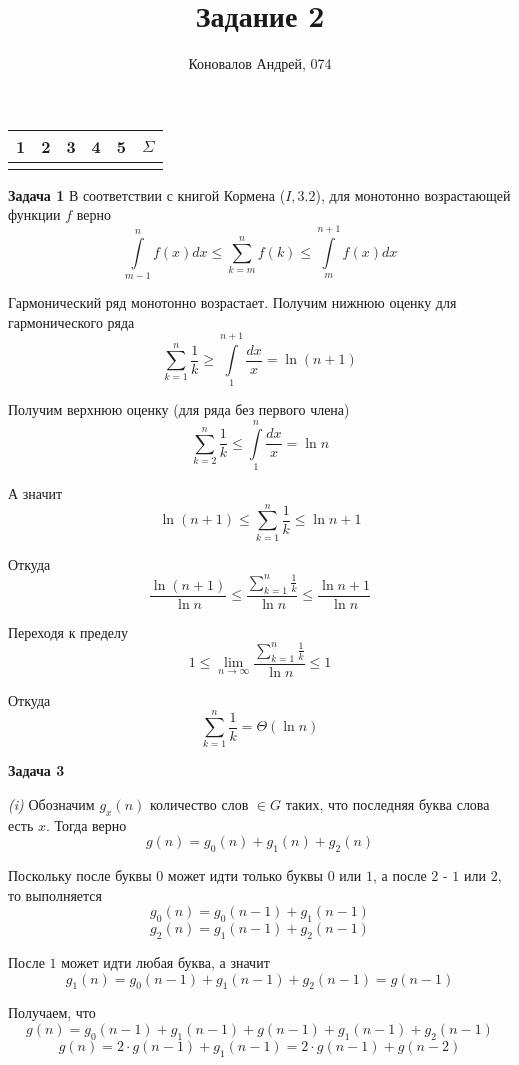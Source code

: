 \documentclass[10pt]{article}
\title{Задание 2}
\author{Коновалов Андрей, 074}
\date{}
\begin{document}
\maketitle

\noindent
\begin{tabularx}{\textwidth}{|C|C|C|C|C|C|}
   & 2 & 3 & 4 & 5 & $\Sigma$ \\
  \hline
  &&&&& \\
  \hline
\end{tabularx}

\bigskip

{\bf Задача 1}
В соответствии с книгой Кормена ($I, 3.2$), для монотонно возрастающей функции $f$ верно
$$
  \int\limits_{m - 1}^n f(x) dx \leq \sum\limits_{k = m}^n f(k) \leq \int\limits_m^{n + 1} f(x) dx
$$

Гармонический ряд монотонно возрастает. Получим нижнюю оценку для гармонического ряда
$$
  \sum\limits_{k = 1}^n \frac{1}{k} \geq \int\limits_1^{n + 1} \frac{dx}{x} = \ln{(n + 1)}
$$

Получим верхнюю оценку (для ряда без первого члена)
$$
  \sum\limits_{k = 2}^n \frac{1}{k} \leq \int\limits_1^n \frac{dx}{x} = \ln{n}
$$

А значит
$$
  \ln{(n + 1)} \leq \sum\limits_{k = 1}^n \frac{1}{k} \leq \ln{n} + 1
$$

Откуда
$$
  \frac{\ln{(n + 1)}}{\ln n} \leq \frac{\sum\limits_{k = 1}^n \frac{1}{k}}{\ln n} \leq \frac{\ln{n} + 1}{\ln n}
$$

Переходя к пределу
$$
  1 \leq \lim\limits_{n \to \infty}{\frac{\sum\limits_{k = 1}^n \frac{1}{k}}{\ln n}} \leq 1
$$

Откуда
$$
  \sum\limits_{k = 1}^n \frac{1}{k} = \Theta(\ln{n})
$$

\medskip

{\bf Задача 3}

{\it (i)}
Обозначим $g_x(n)$ количество слов $\in G$ таких, что последняя буква слова есть $x$.
Тогда верно
$$
  g(n) = g_0(n) + g_1(n) + g_2(n)
$$

Поскольку после буквы $0$ может идти только буквы $0$ или $1$, а после $2$ - $1$ или $2$, то выполняется
$$
  g_0(n) = g_0(n - 1) + g_1(n - 1)
$$
$$
  g_2(n) = g_1(n - 1) + g_2(n - 1)
$$

После $1$ может идти любая буква, а значит
$$
  g_1(n) = g_0(n - 1) + g_1(n - 1) + g_2(n - 1) = g(n - 1)
$$

Получаем, что
$$
  g(n) = g_0(n - 1) + g_1(n - 1) + g(n - 1) + g_1(n - 1) + g_2(n - 1)
$$
$$
  g(n) = 2 \cdot g(n - 1) + g_1(n - 1) = 2 \cdot g(n - 1) + g(n - 2)
$$
\end{document}
